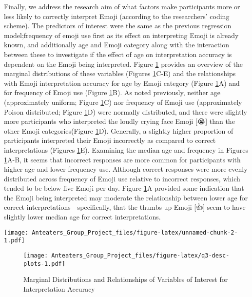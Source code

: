 \documentclass[
]{article}
\begin{document}
Finally, we address the research aim of what factors make participants more or less likely to correctly interpret Emoji (according to the researchers' coding scheme). The predictors of interest were the same as the previous regression model;frequency of emoji use first as its effect on interpreting Emoji is already known, and additionally age and Emoji category along with the interaction between these to investigate if the effect of age on interpretation accuracy is dependent on the Emoji being interpreted. Figure \ref{fig:q3-desc-plots} provides an overview of the marginal distributions of these variables (Figures \ref{fig:q3-desc-plots}C-E) and the relationships with Emoji interpretation accuracy for age by Emoji category (Figure \ref{fig:q3-desc-plots}A) and for frequency of Emoji use (Figure \ref{fig:q3-desc-plots}B). As noted previously, neither age (approximately uniform; Figure \ref{fig:q3-desc-plots}C) nor frequency of Emoji use (approximately Poison distributed; Figure \ref{fig:q3-desc-plots}D) were normally distributed, and there were slightly more participants who interpreted the loudly crying face Emoji {[}😭{]} than the other Emoji categories(Figure \ref{fig:q3-desc-plots}D). Generally, a slightly higher proportion of participants interpreted their Emoji incorrectly as compared to correct interpretations (Figures \ref{fig:q3-desc-plots}E). Examining the median age and frequency in Figures \ref{fig:q3-desc-plots}A-B, it seems that incorrect responses are more common for participants with higher age and lower frequency use. Although correct responses were more evenly distributed across frequency of Emoji use relative to incorrect responses, which tended to be below five Emoji per day. Figure \ref{fig:q3-desc-plots}A provided some indication that the Emoji being interpreted may moderate the relationship between lower age for correct interpretations - specifically, that the thumbs up Emoji {[}👍{]} seem to have slightly lower median age for correct interpretations.

\texttt{[image: Anteaters\_Group\_Project\_files/figure-latex/unnamed-chunk-2-1.pdf]}

\begin{figure}
\centering
\texttt{[image: Anteaters\_Group\_Project\_files/figure-latex/q3-desc-plots-1.pdf]}
\caption{\label{fig:q3-desc-plots}Marginal Distributions and Relationships of Variables of Interest for Interpretation Accuracy}
\end{figure}
\end{document}

